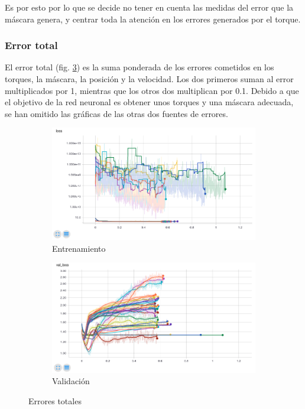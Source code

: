Es por esto por lo que se decide no tener en cuenta las medidas del error que la máscara genera, y centrar toda la atención en los errores generados por el torque.

\subsubsection{Error total}
El error total (fig. \ref{fig:resultados/all}) es la suma ponderada de los errores cometidos en los torques, la máscara, la posición y la velocidad. Los dos primeros suman al error multiplicados por 1, mientras que los otros dos multiplican por 0.1. Debido a que el objetivo de la red neuronal es obtener unos torques y una máscara adecuada, se han omitido las gráficas de las otras dos fuentes de errores.

\begin{figure}
	\begin{subfigure}{0.45\textwidth}
		\centering
		\includegraphics[width=\linewidth]{imagenes/resultados/loss_all.png}
		\caption{Entrenamiento}
		\label{fig:resultados/loss_all}
	\end{subfigure}
	\begin{subfigure}{0.45\textwidth}
		\centering
		\includegraphics[width=\linewidth]{imagenes/resultados/val_loss_all.png}
		\caption{Validación}
		\label{fig:resultados/val_loss_all}
	\end{subfigure}
	\caption{Errores totales}
	\label{fig:resultados/all}
\end{figure}


